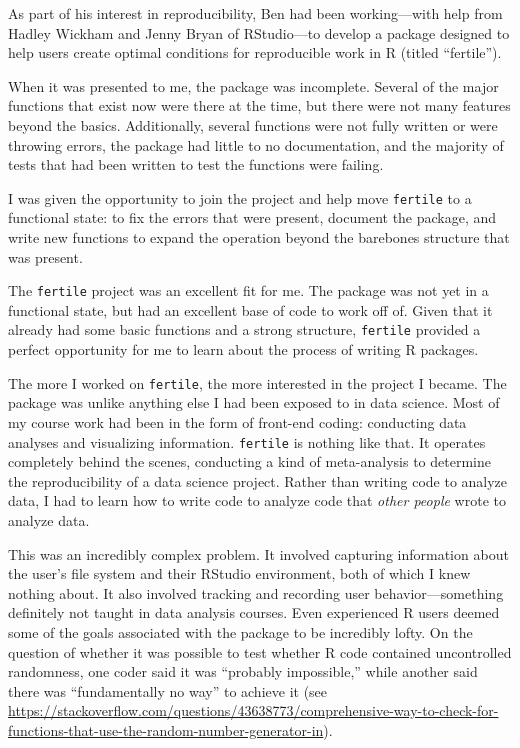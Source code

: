 \documentclass[12pt,twoside]{reedthesis}
\begin{document}
As part of his interest in reproducibility, Ben had been working---with help from Hadley Wickham and Jenny Bryan of RStudio---to develop a package designed to help users create optimal conditions for reproducible work in R (titled ``fertile'').

When it was presented to me, the package was incomplete. Several of the major functions that exist now were there at the time, but there were not many features beyond the basics. Additionally, several functions were not fully written or were throwing errors, the package had little to no documentation, and the majority of tests that had been written to test the functions were failing.

I was given the opportunity to join the project and help move \texttt{fertile} to a functional state: to fix the errors that were present, document the package, and write new functions to expand the operation beyond the barebones structure that was present.

The \texttt{fertile} project was an excellent fit for me. The package was not yet in a functional state, but had an excellent base of code to work off of. Given that it already had some basic functions and a strong structure, \texttt{fertile} provided a perfect opportunity for me to learn about the process of writing R packages.

The more I worked on \texttt{fertile}, the more interested in the project I became. The package was unlike anything else I had been exposed to in data science. Most of my course work had been in the form of front-end coding: conducting data analyses and visualizing information. \texttt{fertile} is nothing like that. It operates completely behind the scenes, conducting a kind of meta-analysis to determine the reproducibility of a data science project. Rather than writing code to analyze data, I had to learn how to write code to analyze code that \emph{other people} wrote to analyze data.

This was an incredibly complex problem. It involved capturing information about the user's file system and their RStudio environment, both of which I knew nothing about. It also involved tracking and recording user behavior---something definitely not taught in data analysis courses. Even experienced R users deemed some of the goals associated with the package to be incredibly lofty. On the question of whether it was possible to test whether R code contained uncontrolled randomness, one coder said it was ``probably impossible,'' while another said there was ``fundamentally no way'' to achieve it (see \url{https://stackoverflow.com/questions/43638773/comprehensive-way-to-check-for-functions-that-use-the-random-number-generator-in}).
\end{document}
